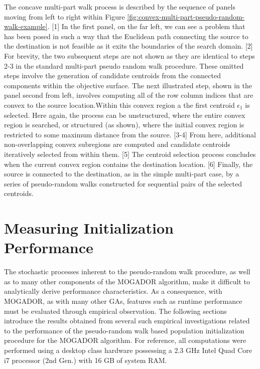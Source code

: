 The concave multi-part walk process is described by the sequence of panels moving from left to right within Figure \ref{fig:convex-multi-part-pseudo-random-walk-example}. [1] In the first panel, on the far left, we can see a problem that has been posed in such a way that the Euclidean path connecting the source to the destination is not feasible as it exits the boundaries of the search domain. [2]  For brevity, the two subsequent steps are not shown as they are identical to steps 2-3 in the standard multi-part pseudo random walk procedure. These omitted steps involve the generation of candidate centroids from the connected components within the objective surface. The next illustrated step, shown in the panel second from left, involves computing all of the row column indices that are convex to the source location.Within this convex region a the first centroid $\epsilon_1$ is selected. Here again, the process can be unstructured, where the entire convex region is searched, or structured  (as shown), where the initial convex region is restricted to some maximum distance from the source. [3-4] From here, additional non-overlapping convex subregions are computed and candidate centroids iteratively selected from within them. [5] The centroid selection process concludes when the current convex region contains the destination location. [6] Finally, the source is connected to the destination, as in the simple multi-part case, by a series of pseudo-random walks constructed for sequential pairs of the selected centroids.

\section{Measuring Initialization Performance}
    
The stochastic processes inherent to the pseudo-random walk procedure, as well as to many other components of the MOGADOR algorithm, make it difficult to analytically derive performance characteristics. As a consequence, with MOGADOR, as with many other GAs, features such as runtime performance must be evaluated through empirical observation. The following sections introduce the results obtained from several such empirical investigations related to the performance of the pseudo-random walk based population initialization procedure for the MOGADOR algorithm. For reference, all computations were performed using a desktop class hardware possessing a 2.3 GHz Intel Quad Core i7 processor (2nd Gen.) with 16 GB of system RAM.
            
